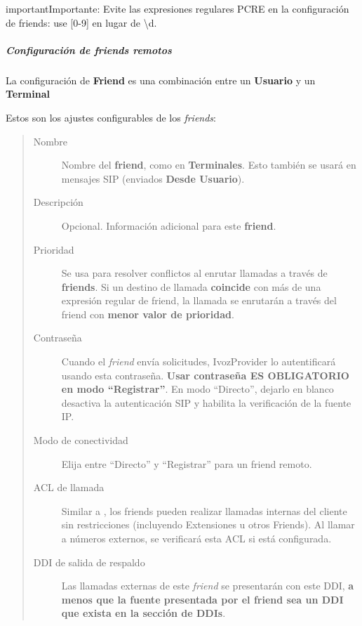 \documentclass[letterpaper,10pt,spanish]{sphinxmanual}
\begin{document}
\begin{notice}{important}{Importante:}
Evite las expresiones regulares PCRE en la configuración de friends: use {[}0-9{]} en lugar de \textbackslash{}d.
\end{notice}


\subparagraph{Configuración de friends remotos}
\label{administration_portal/client/vpbx/routing_endpoints/friends/remote_friends:configuration-of-remote-friends}
La configuración de \textbf{Friend} es una combinación entre un \textbf{Usuario} y un \textbf{Terminal}

Estos son los ajustes configurables de los \emph{friends}:
\begin{quote}
\begin{description}
\item[{Nombre}] \leavevmode
Nombre del \textbf{friend}, como en \textbf{Terminales}. Esto también se usará en mensajes SIP (enviados \textbf{Desde Usuario}).

\item[{Descripción}] \leavevmode
Opcional. Información adicional para este \textbf{friend}.

\item[{Prioridad}] \leavevmode
Se usa para resolver conflictos al enrutar llamadas a través de \textbf{friends}. Si un destino de llamada \textbf{coincide} con más de una expresión regular de friend, la llamada se enrutarán a través del friend con \textbf{menor valor de prioridad}.

\item[{Contraseña}] \leavevmode
Cuando el \emph{friend} envía solicitudes, IvozProvider lo autentificará usando esta contraseña. \textbf{Usar contraseña ES OBLIGATORIO en modo ``Registrar''}. En modo ``Directo'', dejarlo en blanco desactiva la autenticación SIP y habilita la verificación de la fuente IP.

\item[{Modo de conectividad}] \leavevmode
Elija entre ``Directo'' y ``Registrar'' para un friend remoto.

\item[{ACL de llamada}] \leavevmode
Similar a {\hyperref[administration_portal/client/vpbx/users:users]{}}, los friends pueden realizar llamadas internas del cliente sin restricciones (incluyendo Extensiones u otros Friends). Al llamar a números externos, se verificará esta ACL si está configurada.

\item[{DDI de salida de respaldo}] \leavevmode
Las llamadas externas de este \emph{friend} se presentarán con este DDI, \textbf{a menos que la fuente presentada por el friend sea un DDI que exista en la sección de DDIs}.


\end{description}
\end{quote}
\end{document}
